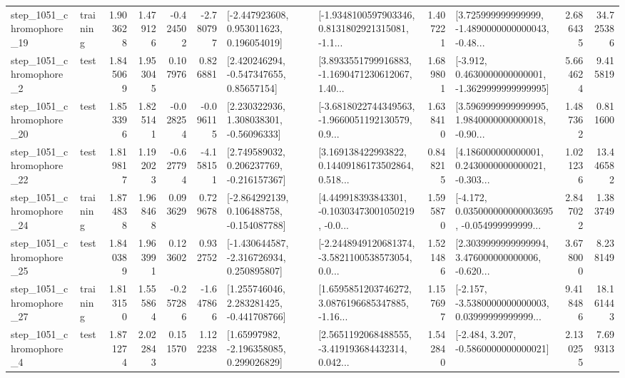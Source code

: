 \begin{tabular}{llrrrrllrlrr}
 step\_1051\_chromophore\_19 &  training &      1.903628 &    1.479126 &     -0.424502 & -2.780797 &    [-2.447923608, 0.953011623, 0.196054019] &  [-1.9348100597903346, 0.8131802921315081, -1.1... &       1.407221 &  [3.725999999999999, -1.4890000000000043, -0.48... &            2.686435 &         34.725386 \\
  step\_1051\_chromophore\_2 &      test &      1.845069 &    1.953045 &      0.107976 &  0.826881 &     [2.420246294, -0.547347655, 0.85657154] &  [3.8933551799916883, -1.1690471230612067, 1.40... &       1.689801 &  [-3.912, 0.4630000000000001, -1.3629999999999995] &            5.664624 &          9.415819 \\
 step\_1051\_chromophore\_20 &      test &      1.853396 &    1.825141 &     -0.028254 & -0.096115 &     [2.230322936, 1.308038301, -0.56096333] &  [-3.6818022744349563, -1.9660051192130579, 0.9... &       1.638410 &  [3.5969999999999995, 1.9840000000000018, -0.90... &            1.487362 &          0.811600 \\
 step\_1051\_chromophore\_22 &      test &      1.819817 &    1.192023 &     -0.627794 & -4.158151 &    [2.749589032, 0.206237769, -0.216157367] &  [3.169138422993822, 0.14409186173502864, 0.518... &       0.848215 &  [4.186000000000001, 0.2430000000000021, -0.303... &            1.021236 &         13.446582 \\
 step\_1051\_chromophore\_24 &  training &      1.874838 &    1.968468 &      0.093629 &  0.729678 &   [-2.864292139, 0.106488758, -0.154087788] &  [4.449918393843301, -0.10303473001050219, -0.0... &       1.595870 &  [-4.172, 0.035000000000003695, -0.054999999999... &            2.847022 &          1.383749 \\
 step\_1051\_chromophore\_25 &      test &      1.840389 &    1.963991 &      0.123602 &  0.932752 &   [-1.430644587, -2.316726934, 0.250895807] &  [-2.2448949120681374, -3.5821100538573054, 0.0... &       1.521486 &  [2.3039999999999994, 3.476000000000006, -0.620... &            3.678000 &          8.238149 \\
 step\_1051\_chromophore\_27 &  training &      1.813150 &    1.555864 &     -0.257286 & -1.647866 &    [1.255746046, 2.283281425, -0.441708766] &  [1.6595851203746272, 3.0876196685347885, -1.16... &       1.157697 &  [-2.157, -3.5380000000000003, 0.03999999999999... &            9.418486 &         18.161443 \\
  step\_1051\_chromophore\_4 &      test &      1.871274 &    2.022843 &      0.151570 &  1.122238 &     [1.65997982, -2.196358085, 0.299026829] &  [2.5651192068488555, -3.419193684432314, 0.042... &       1.542840 &               [-2.484, 3.207, -0.5860000000000021] &            2.130255 &          7.699313 \\

\end{tabular}

